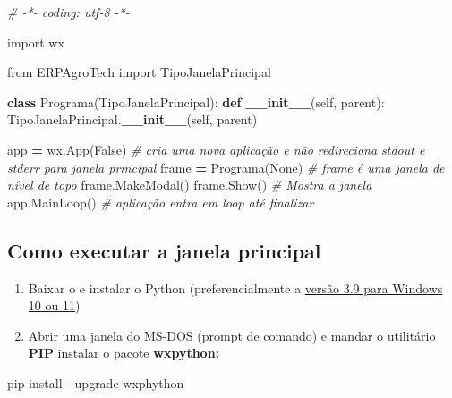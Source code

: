 \documentclass[
]{book}
\newenvironment{Shaded}{\begin{snugshade}}{\end{snugshade}}
\newcommand{\AttributeTok}[1]{\textcolor[rgb]{0.13,0.29,0.53}{#1}}
\newcommand{\CommentTok}[1]{\textcolor[rgb]{0.56,0.35,0.01}{\textit{#1}}}
\newcommand{\FunctionTok}[1]{\textcolor[rgb]{0.13,0.29,0.53}{\textbf{#1}}}
\newcommand{\ImportTok}[1]{#1}
\newcommand{\KeywordTok}[1]{\textcolor[rgb]{0.13,0.29,0.53}{\textbf{#1}}}
\newcommand{\NormalTok}[1]{#1}
\newcommand{\OperatorTok}[1]{\textcolor[rgb]{0.81,0.36,0.00}{\textbf{#1}}}
\newcommand{\VariableTok}[1]{\textcolor[rgb]{0.00,0.00,0.00}{#1}}
\begin{document}
\begin{Shaded}
\begin{Highlighting}[]

\CommentTok{\# {-}*{-} coding: utf{-}8 {-}*{-}}


\ImportTok{import}\NormalTok{ wx}

\ImportTok{from}\NormalTok{ ERPAgroTech }\ImportTok{import}\NormalTok{ TipoJanelaPrincipal}

\KeywordTok{class}\NormalTok{ Programa(TipoJanelaPrincipal):}
    \KeywordTok{def} \FunctionTok{\_\_init\_\_}\NormalTok{(}\VariableTok{self}\NormalTok{, parent):}
\NormalTok{        TipoJanelaPrincipal.}\FunctionTok{\_\_init\_\_}\NormalTok{(}\VariableTok{self}\NormalTok{, parent)}




\NormalTok{app }\OperatorTok{=}\NormalTok{ wx.App(}\VariableTok{False}\NormalTok{)    }\CommentTok{\# cria uma nova aplicação e não redireciona stdout e stderr para janela principal}
\NormalTok{frame }\OperatorTok{=}\NormalTok{ Programa(}\VariableTok{None}\NormalTok{) }\CommentTok{\# frame é uma janela de nível de topo}
\NormalTok{frame.MakeModal()}
\NormalTok{frame.Show()           }\CommentTok{\# Mostra a janela}
\NormalTok{app.MainLoop()         }\CommentTok{\# aplicação entra em loop até finalizar}
\end{Highlighting}
\end{Shaded}

\subsection{Como executar a janela principal}\label{como-executar-a-janela-principal}

\begin{enumerate}
\def\labelenumi{\arabic{enumi}.}
\item
  Baixar o e instalar o Python (preferencialmente a \href{https://www.python.org/ftp/python/3.9.0/python-3.9.0-amd64.exe}{versão 3.9 para Windows 10 ou 11})
\item
  Abrir uma janela do MS-DOS (prompt de comando) e mandar o utilitário \textbf{PIP} instalar o pacote \textbf{wxpython:}
\end{enumerate}

\begin{Shaded}
\begin{Highlighting}[]
\NormalTok{pip install {-}}\AttributeTok{{-}upgrade}\NormalTok{ wxphython}
\end{Highlighting}
\end{Shaded}
\end{document}
